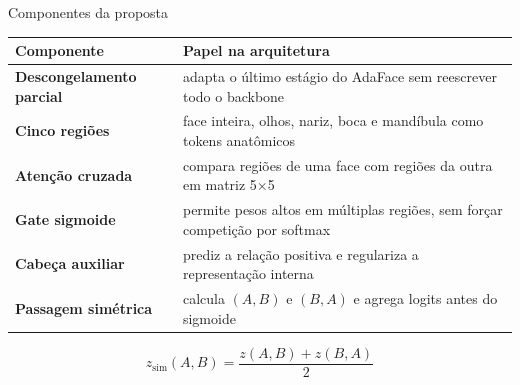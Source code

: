 \documentclass[aspectratio=169,10pt]{beamer}
\begin{document}
\begin{frame}{Componentes da proposta}
  \small
  \begin{tabularx}{\textwidth}{>{\bfseries}p{3.2cm}Y}
    \toprule
    Componente & Papel na arquitetura \\
    \midrule
    Descongelamento parcial & adapta o último estágio do AdaFace sem reescrever todo o backbone \\
    Cinco regiões & face inteira, olhos, nariz, boca e mandíbula como tokens anatômicos \\
    Atenção cruzada & compara regiões de uma face com regiões da outra em matriz 5$\times$5 \\
    Gate sigmoide & permite pesos altos em múltiplas regiões, sem forçar competição por softmax \\
    Cabeça auxiliar & prediz a relação positiva e regulariza a representação interna \\
    Passagem simétrica & calcula $(A,B)$ e $(B,A)$ e agrega logits antes do sigmoide \\
    \bottomrule
  \end{tabularx}

  \vspace{0.3cm}
  \[
    z_{\text{sim}}(A,B)=\frac{z(A,B)+z(B,A)}{2}
  \]
\end{frame}
\end{document}

